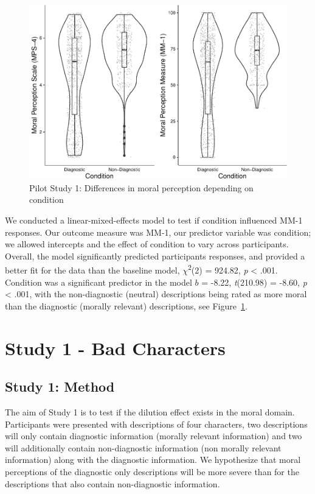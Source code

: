 \documentclass[
  english,
  man,floatsintext]{apa7}
\begin{document}
\begin{figure}
\centering
\includegraphics{moral_dilution_in_chunks_files/figure-latex/pilot1bothconditionplot-1.pdf}
\caption{\label{fig:pilot1bothconditionplot}Pilot Study 1: Differences in moral perception depending on condition}
\end{figure}

We conducted a linear-mixed-effects model to test if condition influenced MM-1 responses. Our outcome measure was MM-1, our predictor variable was condition; we allowed intercepts and the effect of condition to vary across participants. Overall, the model significantly predicted participants responses, and provided a better fit for the data than the baseline model, \(\chi\)\textsuperscript{2}(2) = 924.82, \emph{p} \textless{} .001. Condition was a significant predictor in the model \(b\) = -8.22, \emph{t}(210.98) = -8.60, \emph{p} \textless{} .001, with the non-diagnostic (neutral) descriptions being rated as more moral than the diagnostic (morally relevant) descriptions, see Figure~\ref{fig:pilot1bothconditionplot}.

\hypertarget{study-1---bad-characters}{%
\section{Study 1 - Bad Characters}\label{study-1---bad-characters}}

\hypertarget{study-1-method}{%
\subsection{Study 1: Method}\label{study-1-method}}

The aim of Study 1 is to test if the dilution effect exists in the moral domain. Participants were presented with descriptions of four characters, two descriptions will only contain diagnostic information (morally relevant information) and two will additionally contain non-diagnostic information (non morally relevant information) along with the diagnostic information. We hypothesize that moral perceptions of the diagnostic only descriptions will be more severe than for the descriptions that also contain non-diagnostic information.
\end{document}
